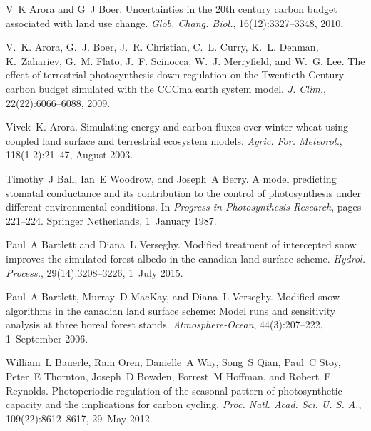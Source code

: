 \begin{DoxyDescription}
\item[\label{_CITEREF_Arora2010-416}%
\mbox{[}9\mbox{]}]V~K Arora and G~J Boer. Uncertainties in the 20th century carbon budget associated with land use change. {\itshape Glob. Chang. Biol.}, 16(12)\+:3327--3348, 2010. 


\item[\label{_CITEREF_Arora2009-9bc}%
\mbox{[}10\mbox{]}]V.~K. Arora, G.~J. Boer, J.~R. Christian, C.~L. Curry, K.~L. Denman, K.~Zahariev, G.~M. Flato, J.~F. Scinocca, W.~J. Merryfield, and W.~G. Lee. The effect of terrestrial photosynthesis down regulation on the Twentieth-\/\+Century carbon budget simulated with the C\+C\+Cma earth system model. {\itshape J. Clim.}, 22(22)\+:6066--6088, 2009. 


\item[\label{_CITEREF_Arora2003-3b7}%
\mbox{[}11\mbox{]}]Vivek~K. Arora. Simulating energy and carbon fluxes over winter wheat using coupled land surface and terrestrial ecosystem models. {\itshape Agric. For. Meteorol.}, 118(1-\/2)\+:21--47, August 2003. 


\item[\label{_CITEREF_Ball1987-ou}%
\mbox{[}12\mbox{]}]Timothy~J Ball, Ian~E Woodrow, and Joseph~A Berry. A model predicting stomatal conductance and its contribution to the control of photosynthesis under different environmental conditions. In {\itshape Progress in Photosynthesis Research}, pages 221--224. Springer Netherlands, 1~January 1987. 


\item[\label{_CITEREF_Bartlett2015-gw}%
\mbox{[}13\mbox{]}]Paul~A Bartlett and Diana~L Verseghy. Modified treatment of intercepted snow improves the simulated forest albedo in the canadian land surface scheme. {\itshape Hydrol. Process.}, 29(14)\+:3208--3226, 1~July 2015. 


\item[\label{_CITEREF_Bartlett2006-xp}%
\mbox{[}14\mbox{]}]Paul~A Bartlett, Murray~D Mac\+Kay, and Diana~L Verseghy. Modified snow algorithms in the canadian land surface scheme\+: Model runs and sensitivity analysis at three boreal forest stands. {\itshape Atmosphere-\/\+Ocean}, 44(3)\+:207--222, 1~September 2006. 


\item[\label{_CITEREF_Bauerle2012-c29}%
\mbox{[}15\mbox{]}]William~L Bauerle, Ram Oren, Danielle~A Way, Song~S Qian, Paul~C Stoy, Peter~E Thornton, Joseph~D Bowden, Forrest~M Hoffman, and Robert~F Reynolds. Photoperiodic regulation of the seasonal pattern of photosynthetic capacity and the implications for carbon cycling. {\itshape Proc. Natl. Acad. Sci. U. S. A.}, 109(22)\+:8612--8617, 29~May 2012. 



\end{DoxyDescription}
